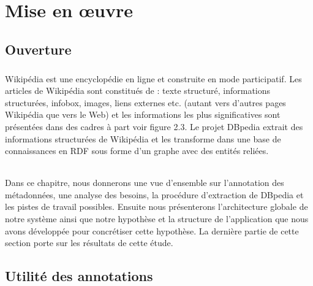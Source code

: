 \chapter{Mise en \oe{}uvre}
\section{Ouverture}
\paragraph{}
Wikipédia est une encyclopédie en ligne et construite en mode participatif.
Les articles de Wikipédia sont constitués de : texte structuré, informations structurées, infobox, images, liens externes etc. (autant vers d'autres pages Wikipédia que vers le Web) et les informations les plus significatives sont présentées dans des cadres à part voir figure 2.3. 
Le projet DBpedia extrait des informations structurées de Wikipédia et les transforme dans une base de connaissances en RDF sous forme d'un graphe avec des entités reliées.
\subparagraph{}
Dans ce chapitre, nous donnerons une vue d'ensemble sur l'annotation des métadonnées, une analyse des besoins, la procédure d'extraction de DBpedia et les pistes de travail possibles. Ensuite nous présenterons l'architecture globale de notre système ainsi que notre hypothèse et la structure de l'application que nous avons développée pour concrétiser cette hypothèse. La dernière partie de cette section porte sur les résultats de cette étude.
\section{Utilité des annotations}
